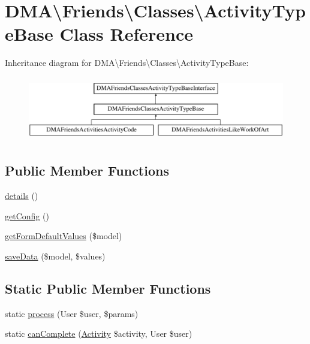 \hypertarget{classDMA_1_1Friends_1_1Classes_1_1ActivityTypeBase}{\section{D\+M\+A\textbackslash{}Friends\textbackslash{}Classes\textbackslash{}Activity\+Type\+Base Class Reference}
\label{classDMA_1_1Friends_1_1Classes_1_1ActivityTypeBase}
}
Inheritance diagram for D\+M\+A\textbackslash{}Friends\textbackslash{}Classes\textbackslash{}Activity\+Type\+Base\+:\begin{figure}[H]
\begin{center}
\leavevmode
\includegraphics[height=2.837838cm]{d3/d35/classDMA_1_1Friends_1_1Classes_1_1ActivityTypeBase}
\end{center}
\end{figure}
\subsection*{Public Member Functions}
\begin{DoxyCompactItemize}
\item 
\hyperlink{classDMA_1_1Friends_1_1Classes_1_1ActivityTypeBase_a6d83ca41e1c971c65cbc360e6097ad79}{details} ()
\item 
\hyperlink{classDMA_1_1Friends_1_1Classes_1_1ActivityTypeBase_ac540cd6b45fa5f41575523bbb300d18c}{get\+Config} ()
\item 
\hyperlink{classDMA_1_1Friends_1_1Classes_1_1ActivityTypeBase_ae46d0cc7e040eb4166e55a00d8d30dc8}{get\+Form\+Default\+Values} (\$model)
\item 
\hyperlink{classDMA_1_1Friends_1_1Classes_1_1ActivityTypeBase_a69d28814a4cc0c3798d1ab7a95e14ef3}{save\+Data} (\$model, \$values)
\end{DoxyCompactItemize}
\subsection*{Static Public Member Functions}
\begin{DoxyCompactItemize}
\item 
static \hyperlink{classDMA_1_1Friends_1_1Classes_1_1ActivityTypeBase_a772667f95a25c6aa44e31ce9c6903384}{process} (User \$user, \$params)
\item 
static \hyperlink{classDMA_1_1Friends_1_1Classes_1_1ActivityTypeBase_acc0d37915d9170364f381945fd01f7c2}{can\+Complete} (\hyperlink{classDMA_1_1Friends_1_1Models_1_1Activity}{Activity} \$activity, User \$user)
\end{DoxyCompactItemize}
